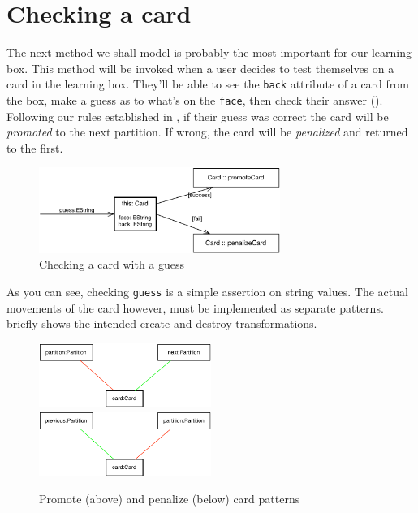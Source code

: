 \newpage
\hypertarget{sec:checkCard}{}
\section{Checking a card}
\genHeader

The next method we shall model is probably the most important for our learning box. This method will be invoked when a user decides to test themselves on a card
in the learning box. They'll be able to see the \texttt{back} attribute of a card from the box, make a guess as to what's on the \texttt{face}, then 
check their answer (). Following our rules established in , if their guess was correct the card will be
\emph{promoted} to the next partition. If wrong, the card will be \emph{penalized} and returned to the first.

\begin{figure}[htbp]
 	\centering
   \includegraphics[width=0.7\textwidth]{../../org.moflon.doc.handbook.03_storyDiagrams/04_checkCard/splashImages/goal_checkCard.pdf}
 	\caption{Checking a card with a guess}
 	\label{fig:goal_check}
\end{figure}
\FloatBarrier

As you can see, checking \texttt{guess} is a simple assertion on string values. The actual movements of the card however, must be implemented as separate
patterns.  briefly shows the intended create and destroy transformations.

\begin{figure}[htbp]
 	\centering
   \includegraphics[width=0.5\textwidth]{../../org.moflon.doc.handbook.03_storyDiagrams/04_checkCard/splashImages/checkCard_promote.pdf}
   \\ \vspace{1cm}
    \includegraphics[width=0.5\textwidth]{../../org.moflon.doc.handbook.03_storyDiagrams/04_checkCard/splashImages/checkCard_penalize.pdf}
 	\caption{Promote (above) and penalize (below) card patterns}
 	\label{fig:patterns_check}
\end{figure}
\FloatBarrier

